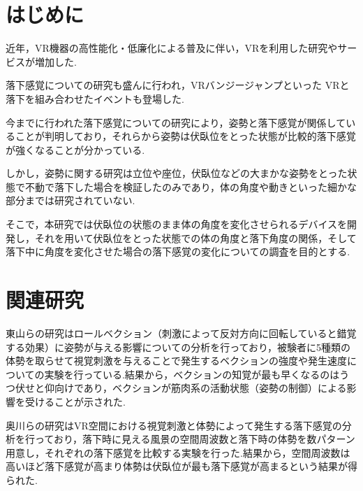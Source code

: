 \documentclass[uplatex]{jsarticle}
\begin{document}
\vspace{3mm}

\setcounter{page}{9}

\section{はじめに}
近年，VR機器の高性能化・低廉化による普及に伴い，VRを利用した研究やサービスが増加した.

落下感覚についての研究も盛んに行われ，VRバンジージャンプといった
VRと落下を組み合わせたイベントも登場した.

今までに行われた落下感覚についての研究により，姿勢と落下感覚が関係していることが判明しており，それらから姿勢は伏臥位をとった状態が比較的落下感覚が強くなることが分かっている.

しかし，姿勢に関する研究は立位や座位，伏臥位などの大まかな姿勢をとった状態で不動で落下した場合を検証したのみであり，体の角度や動きといった細かな部分までは研究されていない.

そこで，本研究では伏臥位の状態のまま体の角度を変化させられるデバイスを開発し，それを用いて伏臥位をとった状態での体の角度と落下角度の関係，そして落下中に角度を変化させた場合の落下感覚の変化についての調査を目的とする.


\section{関連研究}
東山らの研究\cite{vection}はロールベクション（刺激によって反対方向に回転していると錯覚する効果）に姿勢が与える影響についての分析を行っており，被験者に5種類の体勢を取らせて視覚刺激を与えることで発生するベクションの強度や発生速度についての実験を行っている.結果から，ベクションの知覚が最も早くなるのはうつ伏せと仰向けであり，ベクションが筋肉系の活動状態（姿勢の制御）による影響を受けることが示された.

奥川らの研究\cite{spatial_stimulation_effect_falling}はVR空間における視覚刺激と体勢によって発生する落下感覚の分析を行っており，落下時に見える風景の空間周波数と落下時の体勢を数パターン用意し，それぞれの落下感覚を比較する実験を行った.結果から，空間周波数は高いほど落下感覚が高まり体勢は伏臥位が最も落下感覚が高まるという結果が得られた.
\end{document}
